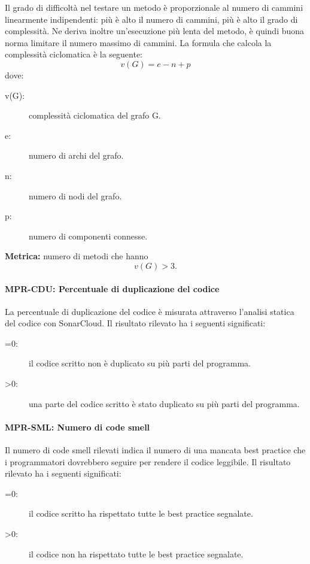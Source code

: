 \documentclass[../../norme-di-progetto.tex]{subfiles}
\begin{document}
Il grado di difficoltà nel testare un metodo è proporzionale al numero di cammini linearmente indipendenti: più è alto il numero di cammini, più è alto il grado di complessità.
Ne deriva inoltre un'esecuzione più lenta del metodo, è quindi buona norma limitare il numero massimo di cammini. La formula che calcola la complessità ciclomatica è la seguente:
\[
 v(G) = e - n + p
\]
dove:
\begin{description}
 \item[v(G):] complessità ciclomatica del grafo G. %
 \item[e:] numero di archi del grafo.
 \item[n:] numero di nodi del grafo.
 \item[p:] numero di componenti connesse.
\end{description}
\textbf{Metrica:} numero di metodi che hanno \[v(G) > 3.\]




\paragraph{MPR-CDU: Percentuale di duplicazione del codice}%
\label{par:MPR-CDU_percentuale_duplicazione_codice}

La percentuale di duplicazione del codice è misurata attraverso l'analisi statica del codice con SonarCloud.
Il risultato rilevato ha i seguenti significati:
\begin{description}
  \item[=0:] il codice scritto non è duplicato su più parti del programma.
  \item[>0:] una parte del codice scritto è stato duplicato su più parti del programma.
\end{description}


\paragraph{MPR-SML: Numero di code smell}%
\label{par:MPR-SML_numero_di_code_smell}

Il numero di code smell rilevati indica il numero di una mancata best practice che i programmatori dovrebbero seguire per rendere il codice leggibile.
Il risultato rilevato ha i seguenti significati:
\begin{description}
  \item[=0:] il codice scritto ha rispettato tutte le best practice segnalate.
  \item[>0:] il codice non ha rispettato tutte le best practice segnalate.
\end{description}
\end{document}
